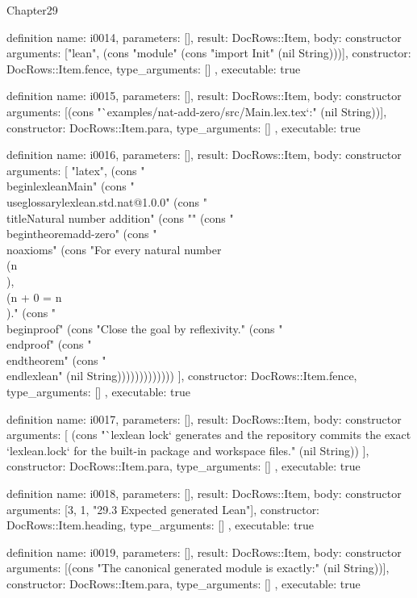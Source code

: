 \begin{lexlean}{Chapter29}
\begin{semanticmodule}
definition{
  name: i0014,
  parameters: [],
  result: DocRows::Item,
  body: constructor{
    arguments: ["lean", (cons "module" (cons "import Init" (nil String)))],
    constructor: DocRows::Item.fence,
    type_arguments: []
  },
  executable: true
}

definition{
  name: i0015,
  parameters: [],
  result: DocRows::Item,
  body: constructor{
    arguments: [(cons "`examples/nat-add-zero/src/Main.lex.tex`:" (nil String))],
    constructor: DocRows::Item.para,
    type_arguments: []
  },
  executable: true
}

definition{
  name: i0016,
  parameters: [],
  result: DocRows::Item,
  body: constructor{
    arguments: [
      "latex",
      (cons "\\begin{lexlean}{Main}" (cons "\\useglossary{lexlean.std.nat@1.0.0}" (cons "\\title{Natural number addition}" (cons "" (cons "\\begin{theorem}{add-zero}" (cons "\\noaxioms" (cons "For every natural number \\(n\\), \\(n + 0 = n\\)." (cons "\\begin{proof}" (cons "Close the goal by reflexivity." (cons "\\end{proof}" (cons "\\end{theorem}" (cons "\\end{lexlean}" (nil String)))))))))))))
    ],
    constructor: DocRows::Item.fence,
    type_arguments: []
  },
  executable: true
}

definition{
  name: i0017,
  parameters: [],
  result: DocRows::Item,
  body: constructor{
    arguments: [
      (cons "`lexlean lock` generates and the repository commits the exact `lexlean.lock` for the built-in package and workspace files." (nil String))
    ],
    constructor: DocRows::Item.para,
    type_arguments: []
  },
  executable: true
}

definition{
  name: i0018,
  parameters: [],
  result: DocRows::Item,
  body: constructor{
    arguments: [3, 1, "29.3 Expected generated Lean"],
    constructor: DocRows::Item.heading,
    type_arguments: []
  },
  executable: true
}

definition{
  name: i0019,
  parameters: [],
  result: DocRows::Item,
  body: constructor{
    arguments: [(cons "The canonical generated module is exactly:" (nil String))],
    constructor: DocRows::Item.para,
    type_arguments: []
  },
  executable: true
}


\end{semanticmodule}
\end{lexlean}
